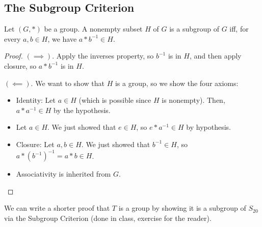 \subsection{The Subgroup Criterion}

\begin{proposition}
Let $(G, *)$ be a group. A nonempty subset $H$ of $G$ is a subgroup of $G$ iff, for every $a, b \in H$, we have $a * b^{-1} \in H$.
\end{proposition}

\begin{proof}
$(\implies)$. Apply the inverses property, so $b^{-1}$ is in $H$, and then apply closure, so $a * b^{-1}$ is in $H$. 

$(\impliedby)$. We want to show that $H$ is a group, so we show the four axioms:
\begin{itemize}
    \item Identity: Let $a \in H$ (which is possible since $H$ is nonempty). Then, $a * a^{-1} \in H$ by the hypothesis.
    \item Let $a \in H$. We just showed that $e \in H$, so $e * a^{-1} \in H$ by hypothesis.
    \item Closure: Let $a, b \in H$. We just showed that $b^{-1} \in H$, so $a * (b^{-1})^{-1} = a * b \in H$.
    \item Associativity is inherited from $G$.
\end{itemize}
\end{proof}

We can write a shorter proof that $T$ is a group by showing it is a subgroup of $S_{20}$ via the Subgroup Criterion (done in class, exercise for the reader).